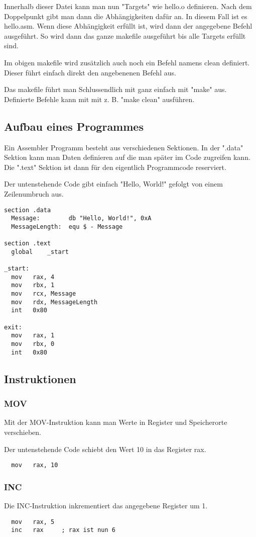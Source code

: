 \documentclass[12pt, a4paper, oneside]{article}
\begin{document}
Innerhalb dieser Datei kann man nun "Targets" wie hello.o definieren. Nach dem Doppelpunkt gibt man dann die Abhängigkeiten dafür an. In diesem Fall ist es hello.asm. Wenn diese Abhängigkeit erfüllt ist, wird dann der angegebene Befehl ausgeführt. So wird dann das ganze makefile ausgeführt bis alle Targets erfüllt sind.

Im obigen makefile wird zusätzlich auch noch ein Befehl namens clean definiert. Dieser führt einfach direkt den angebenenen Befehl aus.

Das makefile führt man Schlussendlich mit ganz einfach mit "make" aus. Definierte Befehle kann mit mit z. B. "make clean" ausführen.

\subsection{Aufbau eines Programmes}
Ein Assembler Programm besteht aus verschiedenen Sektionen. In der ".data" Sektion kann man Daten definieren auf die man später im Code zugreifen kann. Die ".text" Sektion ist dann für den eigentlich Programmcode reserviert.

Der untenstehende Code gibt einfach "Hello, World!" gefolgt von einem Zeilenumbruch aus.
\begin{verbatim}
section .data
  Message:        db "Hello, World!", 0xA
  MessageLength:  equ $ - Message

section .text
  global	_start

_start:
  mov   rax, 4
  mov   rbx, 1
  mov   rcx, Message
  mov   rdx, MessageLength
  int   0x80

exit:
  mov   rax, 1
  mov   rbx, 0
  int   0x80
\end{verbatim}

\subsection{Instruktionen}
\subsubsection{MOV}
Mit der MOV-Instruktion kann man Werte in Register und Speicherorte verschieben.

Der untenstehende Code schiebt den Wert 10 in das Register rax.
\begin{verbatim}
  mov   rax, 10 
\end{verbatim}

\subsubsection{INC}
Die INC-Instruktion inkrementiert das angegebene Register um 1.
\begin{verbatim}
  mov   rax, 5
  inc   rax     ; rax ist nun 6
\end{verbatim}
\end{document}
